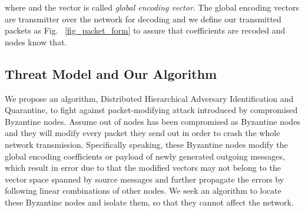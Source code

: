 \documentclass[conference]{IEEEtran}
\begin{document}
where  and the vector {\boldmath}  is called \emph{global encoding vector}. The global encoding vectors are transmitter over the network for decoding and we define our transmitted packets as Fig. ~\ref{fig_packet_form} to assure that coefficients  are recoded and nodes know that.

\subsection{Threat Model and Our Algorithm}
We propose an algorithm, Distributed Hierarchical Adversary Identification and Quarantine, to fight against packet-modifying attack introduced by compromised Byzantine nodes. Assume  out of  nodes has been compromised as Byzantine nodes and they will modify every packet they send out in order to crash the whole network transmission. Specifically speaking, these Byzantine nodes modify the global encoding coefficients or payload of newly generated outgoing messages, which result in error due to that the modified vectors may not belong to the vector space spanned by source messages and further propagate the errors by following linear combinations of other nodes. We seek an algorithm to locate these Byzantine nodes and isolate them, so that they cannot affect the network.
\end{document}
